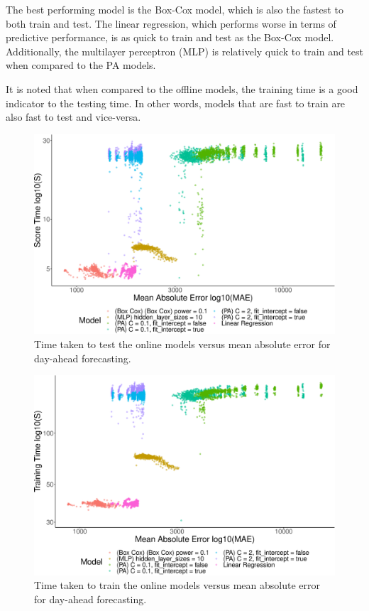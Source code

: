 The best performing model is the Box-Cox model, which is also the fastest to both train and test. The linear regression, which performs worse in terms of predictive performance, is as quick to train and test as the Box-Cox model. Additionally, the multilayer perceptron (MLP) is relatively quick to train and test when compared to the PA models. 

It is noted that when compared to the offline models, the training time is a good indicator to the testing time. In other words, models that are fast to train are also fast to test and vice-versa.




\begin{figure}
	\centering
	\includegraphics[width=0.6\columnwidth]{Chapter5/figures/market-forecasting/results/online_testing_time_vs_mae_all_results_opaque.eps}
	\caption{Time taken to test the online models versus mean absolute error for day-ahead forecasting.}
	\label{fig:online_test_vs_mae}
\end{figure}

\begin{figure}
	\centering
	\includegraphics[width=0.6\columnwidth]{Chapter5/figures/market-forecasting/results/online_training_time_vs_mae_all_results_opaque.eps}
	\caption{Time taken to train the online models versus mean absolute error for day-ahead forecasting.}
	\label{fig:online_train_vs_mae}
\end{figure}








